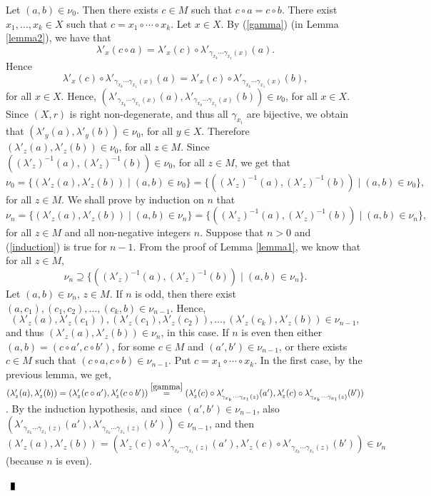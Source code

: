 \documentclass[10pt]{article}
\newenvironment{proof}{\par\noindent{\bf Proof.}}{$\qed$\par\bigskip}
\newcommand{\qed}{\enspace\vrule  height6pt  width4pt  depth2pt}
\begin{document}
\begin{proof}
	
	Let $(a,b)\in \nu_0$. Then there exists $c\in M$ such that
	$c\circ a=c\circ b$. There exist $x_1,\dots ,x_k\in X$ such that $c=x_1\circ\cdots\circ x_k$.  Let $x\in X$. By (\ref{gamma})  (in Lemma \ref{lemma2}), we have that
	$$\lambda'_x(c\circ a)=\lambda'_x(c)\circ\lambda'_{\gamma_{x_k}\cdots \gamma_{x_1}(x)}(a).$$
	Hence
	$$\lambda'_x(c)\circ\lambda'_{\gamma_{x_k}\cdots \gamma_{x_1}(x)}(a)=\lambda'_x(c)\circ\lambda'_{\gamma_{x_k}\cdots \gamma_{x_1}(x)}(b),$$
	for all $x\in X$.
Hence, $(\lambda'_{\gamma_{x_k}\cdots \gamma_{x_1}(x)}(a), \lambda'_{\gamma_{x_k}\cdots \gamma_{x_1}(x)}(b)) \in \nu_0$, for all $x \in X$. 	
Since $(X,r)$ is right non-degenerate, and thus all $\gamma_{x_i}$ are bijective, we obtain that 
$(\lambda'_y(a),\lambda'_y(b))\in\nu_0$, for all $y\in X$. Therefore
$(\lambda'_z(a),\lambda'_z(b))\in\nu_0$, for all $z\in M$. Since $((\lambda'_z)^{-1}(a),(\lambda'_z)^{-1}(b))\in\nu_0$, for all $z\in M$,
we get that
$$\nu_0=\{ (\lambda'_z(a),\lambda'_z(b))\mid (a,b)\in \nu_0\}=\{((\lambda'_z)^{-1}(a),(\lambda'_z)^{-1}(b))\mid (a,b)\in \nu_0\},$$
for all $z\in M$. We shall prove by induction on $n$ that
\begin{equation}\label{induction}
	\nu_n=\{ (\lambda'_z(a),\lambda'_z(b))\mid (a,b)\in \nu_n\}=\{((\lambda'_z)^{-1}(a),(\lambda'_z)^{-1}(b))\mid (a,b)\in \nu_n\},
\end{equation}
	for all $z\in M$ and all non-negative integers $n$. 	Suppose that $n>0$  and (\ref{induction}) is true for $n-1$. From the proof of Lemma \ref{lemma1}, we know that for
	all $z\in M$,
	$$\nu_n\supseteq \{ ( (\lambda'_z)^{-1}(a),(\lambda'_z)^{-1}(b))\mid (a,b)\in\nu_n\}.$$
	Let $(a,b)\in \nu_n$, $z\in M$. If $n$ is odd, then there exist $(a,c_1),(c_1,c_2),\dots ,(c_k,b)\in \nu_{n-1}$. Hence,
	$$(\lambda'_z(a),\lambda'_z(c_1)), (\lambda'_z(c_1),\lambda'_z(c_2)),\dots, (\lambda'_z(c_k),\lambda'_z(b))\in\nu_{n-1},$$
	and thus
	$(\lambda'_z(a),\lambda'_z(b))\in \nu_n$, in this case.
	If $n$ is even then either $(a,b)=(c\circ a',c\circ b')$, for some $c\in M$ and $(a',b')\in \nu_{n-1}$, or there exists $c\in M$ such that $(c\circ a,c\circ b)\in\nu_{n-1}$. Put $c=x_1 \circ \cdots \circ x_k$.
 	In the first case,
    by the previous lemma, we get, $(\lambda'_z(a),\lambda'_z(b))= (\lambda'_z(c\circ a'),\lambda'_z(c\circ b'))\stackrel{\eqref{gamma}}{=} (\lambda'_z(c)\circ\lambda'_{\gamma_{x_k} \cdots \gamma_{x_1}(z)}(a'),\lambda'_z(c)\circ\lambda'_{\gamma_{x_k} \cdots \gamma_{x_1}(z)}(b'))$. 
	By the induction hypothesis, and since $(a',b') \in \nu_{n-1}$, also $(\lambda'_{\gamma_{x_k} \cdots \gamma_{x_1}(z)}(a'),\lambda'_{\gamma_{x_k} \cdots \gamma_{x_1}(z)}(b')) \in \nu_{n-1}$, and then $(\lambda'_z(a),\lambda'_z(b))=(\lambda'_z(c)\circ\lambda'_{\gamma_{x_k} \cdots \gamma_{x_1}(z)}(a'),\lambda'_z(c)\circ\lambda'_{\gamma_{x_k} \cdots \gamma_{x_1}(z)}(b'))\in \nu_n$ (because $n$ is even).  

\end{proof}
\end{document}
